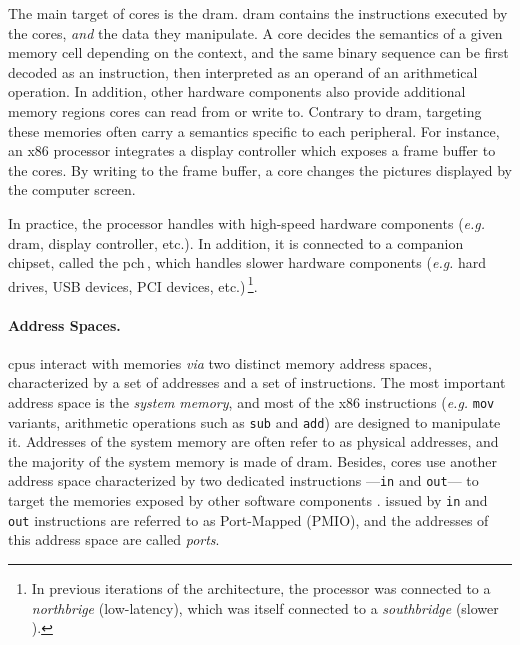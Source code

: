The main target of cores \IOs is the \ac{dram}.
%
\ac{dram} contains the instructions executed by the cores, \emph{and} the data
they manipulate.
%
A core decides the semantics of a given memory cell depending on the context,
and the same binary sequence can be first decoded as an instruction, then
interpreted as an operand of an arithmetical operation.
%
In addition, other hardware components also provide additional memory regions
cores can read from or write to.
%
Contrary to \ac{dram}, \IOs targeting these memories often carry a semantics
specific to each peripheral.
%
For instance, an x86 processor integrates a display controller which exposes a
frame buffer to the cores.
%
By writing to the frame buffer, a core changes the pictures displayed by the
computer screen.

In practice, the processor handles \IOs with high-speed hardware components
(\emph{e.g.} \ac{dram}, display controller, etc.).
%
In addition, it is connected to a companion chipset, called the
\ac{pch}\,\cite{turley2014introx86}, which handles slower hardware components
(\emph{e.g.}  hard drives, USB devices, PCI devices, etc.)\,\footnote{In
  previous iterations of the architecture, the processor was connected to a
  \emph{northbrige} (low-latency), which was itself connected to a
  \emph{southbridge} (slower \IOs).}.

\paragraph{Address Spaces.}
%
\acp{cpu} interact with memories \emph{via} two distinct memory address spaces,
characterized by a set of addresses and a set of instructions.
%
The most important address space is the \emph{system memory}, and most of the
x86 instructions (\emph{e.g.} \texttt{mov} variants, arithmetic operations such
as \texttt{sub} and \texttt{add}) are designed to manipulate it.
%
Addresses of the system memory are often refer to as physical addresses, and the
majority of the system memory is made of \ac{dram}.
%
Besides, cores use another address space characterized by two dedicated
instructions ---\texttt{in} and \texttt{out}--- to target the memories exposed
by other software components .
%
\IOs issued by \texttt{in} and \texttt{out} instructions are referred to as
Port-Mapped \IOs (PMIO), and the addresses of this address space are called
\emph{ports}.

